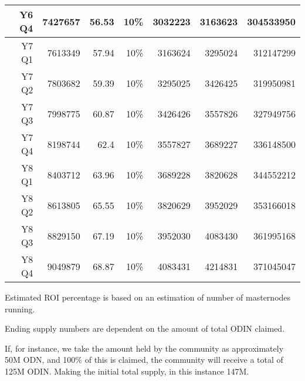 \documentclass[12pt,letterpaper]{article}
\begin{document}
\begin{center}
\begin{adjustbox}{max width=\textwidth}
\begin{threeparttable}
\begin{tabular}{|rrrrrrr|}
Y6 Q4 & 7427657 & 56.53 & 10\% & 3032223 & 3163623 & 304533950\tabularnewline
\hline
Y7 Q1 & 7613349 & 57.94 & 10\% & 3163624 & 3295024 & 312147299\tabularnewline
\hline
Y7 Q2 & 7803682 & 59.39 & 10\% & 3295025 & 3426425 & 319950981\tabularnewline
\hline
Y7 Q3 & 7998775 & 60.87 & 10\% & 3426426 & 3557826 & 327949756\tabularnewline
\hline
Y7 Q4 & 8198744 & 62.4 & 10\% & 3557827 & 3689227 & 336148500\tabularnewline
\hline
Y8 Q1 & 8403712 & 63.96 & 10\% & 3689228 & 3820628 & 344552212\tabularnewline
\hline
Y8 Q2 & 8613805 & 65.55 & 10\% & 3820629 & 3952029 & 353166018\tabularnewline
\hline
Y8 Q3 & 8829150 & 67.19 & 10\% & 3952030 & 4083430 & 361995168\tabularnewline
\hline
Y8 Q4 & 9049879 & 68.87 & 10\% & 4083431 & 4214831 & 371045047\tabularnewline
\hline
\end{tabular}
\begin{tablenotes}
   \footnotesize 
   \item[\dag] Estimated ROI percentage is based on an estimation of number of masternodes running.
   \item[\dag\dag]Ending supply numbers are dependent on the amount of total ODIN claimed. 
   \normalsize
\end{tablenotes}
\end{threeparttable}
\end{adjustbox}
\end{center}
If, for instance, we take the amount held by the community as approximately 50M ODN, and 100\% of this is claimed, the community will receive a total of 125M ODIN. Making the initial total supply, in this instance 147M. 


\end{document}
